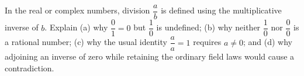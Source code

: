 In the real or complex numbers, division $\dfrac{a}{b}$ is defined using the multiplicative inverse of $b$. Explain (a) why $\dfrac{0}{1}=0$ but $\dfrac{1}{0}$ is undefined; (b) why neither $\dfrac{1}{0}$ nor $\dfrac{0}{0}$ is a rational number; (c) why the usual identity $\dfrac{a}{a}=1$ requires $a\ne0$; and (d) why adjoining an inverse of zero while retaining the ordinary field laws would cause a contradiction.
